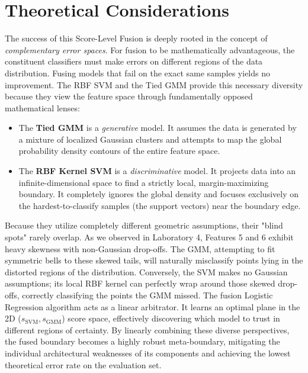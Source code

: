 \section{Theoretical Considerations}
The success of this Score-Level Fusion is deeply rooted in the concept of \textit{complementary error spaces}. For fusion to be mathematically advantageous, the constituent classifiers must make errors on different regions of the data distribution. Fusing models that fail on the exact same samples yields no improvement.
The RBF SVM and the Tied GMM provide this necessary diversity because they view the feature space through fundamentally opposed mathematical lenses:
\begin{itemize}
\item The \textbf{Tied GMM} is a \textit{generative} model. It assumes the data is generated by a mixture of localized Gaussian clusters and attempts to map the global probability density contours of the entire feature space.
\item The \textbf{RBF Kernel SVM} is a \textit{discriminative} model. It projects data into an infinite-dimensional space to find a strictly local, margin-maximizing boundary. It completely ignores the global density and focuses exclusively on the hardest-to-classify samples (the support vectors) near the boundary edge.
\end{itemize}
Because they utilize completely different geometric assumptions, their "blind spots" rarely overlap. As we observed in Laboratory 4, Features 5 and 6 exhibit heavy skewness with non-Gaussian drop-offs. The GMM, attempting to fit symmetric bells to these skewed tails, will naturally misclassify points lying in the distorted regions of the distribution. Conversely, the SVM makes no Gaussian assumptions; its local RBF kernel can perfectly wrap around those skewed drop-offs, correctly classifying the points the GMM missed.
The fusion Logistic Regression algorithm acts as a linear arbitrator. It learns an optimal plane in the 2D ($s_{\text{SVM}}, s_{\text{GMM}}$) score space, effectively discovering which model to trust in different regions of certainty. By linearly combining these diverse perspectives, the fused boundary becomes a highly robust meta-boundary, mitigating the individual architectural weaknesses of its components and achieving the lowest theoretical error rate on the evaluation set.